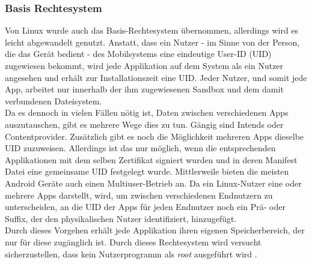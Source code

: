 	\subsubsection{Basis Rechtesystem}\label{sec:BasisRechteSystem}
	Von Linux wurde auch das Basis-Rechtesystem übernommen, allerdings wird es
	leicht abgewandelt genutzt. Anstatt, dass ein Nutzer - im Sinne von der Person,
	die das Gerät bedient - des Mobilsystems eine eindeutige User-ID (UID)
	zugewiesen bekommt, wird jede Applikation auf dem System als ein Nutzer
	angesehen und erhält zur Installationszeit eine UID. Jeder Nutzer, und somit
	jede App, arbeitet nur innerhalb der ihm zugewiesenen Sandbox und dem damit
	verbundenen Dateisystem.\\
	Da es dennoch in vielen Fällen nötig ist, Daten zwischen verschiedenen Apps
	auszutauschen, gibt es mehrere Wege dies zu tun. Gängig sind
	Intends oder Contentprovider. Zusätzlich gibt es noch die Möglichkeit mehreren
	Apps dieselbe UID zuzuweisen. Allerdings ist das nur möglich, wenn die
	entsprechenden Applikationen mit dem selben Zertifikat signiert wurden und in
	deren Manifest Datei eine gemeinsame UID festgelegt wurde.
	Mittlerweile bieten die meisten Android Geräte auch einen Multiuser-Betrieb
	an. Da ein Linux-Nutzer eine oder mehrere Apps darstellt, wird, um zwischen
	verschiedenen Endnutzern zu unterscheiden, an die UID der Apps für jeden
	Endnutzer noch ein Prä- oder Suffix, der den physikalischen Nutzer
	identifiziert, hinzugefügt.\\
	Durch dieses Vorgehen erhält jede Applikation ihren eigenen Speicherbereich,
	der nur für diese zugänglich ist. Durch dieses Rechtesystem wird versucht
	sicherzustellen, dass kein Nutzerprogramm als \textit{root} ausgeführt wird
	\cite[Kapitel Android's Security Model  - Application Sandboxing]{Drake2014}.
	

